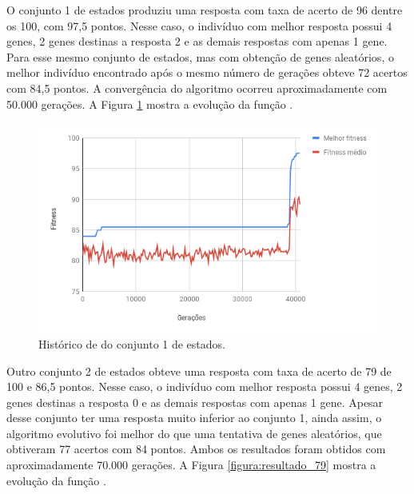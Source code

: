 O conjunto 1 de estados produziu uma resposta com taxa de acerto de 96 dentre os 100, com 97,5 pontos. Nesse caso, o indivíduo com melhor resposta possui 4 genes, 2 genes destinas a resposta 2 e as demais respostas com apenas 1 gene. Para esse mesmo conjunto de estados, mas com obtenção de genes aleatórios, o melhor indivíduo encontrado após o mesmo número de gerações obteve 72 acertos com 84,5 pontos. A convergência do algoritmo ocorreu aproximadamente com 50.000 gerações. A Figura \ref{figura:resultado_97} mostra a evolução da função \fitness.

\begin{figure}[htb]
    \caption{Histórico de \fitness do conjunto 1 de estados.}
    \label{figura:resultado_97}
    \centering
    \includegraphics[scale=0.8]{images/resultado_97}
    \fautor
\end{figure}

Outro conjunto 2 de estados obteve uma resposta com taxa de acerto de 79 de 100 e 86,5 pontos. Nesse caso, o indivíduo com melhor resposta possui 4 genes, 2 genes destinas a resposta 0 e as demais respostas com apenas 1 gene. Apesar desse conjunto ter uma resposta muito inferior ao conjunto 1, ainda assim, o algoritmo evolutivo foi melhor do que uma tentativa de genes aleatórios, que obtiveram 77 acertos com 84 pontos. Ambos os resultados foram obtidos com aproximadamente 70.000 gerações. A Figura \ref{figura:resultado_79} mostra a evolução da função \fitness.


